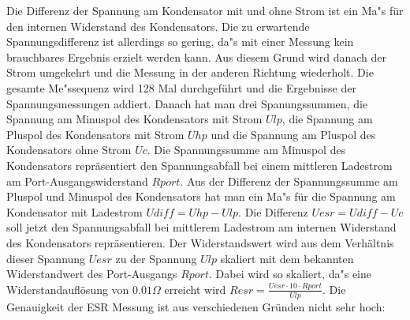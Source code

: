 Die Differenz der Spannung am Kondensator mit und ohne Strom ist ein Ma"s f\"ur den internen Widerstand des Kondensators.
Die zu erwartende Spannungsdifferenz ist allerdings so gering, da"s mit einer Messung kein brauchbares Ergebnis erzielt
werden kann.
Aus diesem Grund wird danach der Strom umgekehrt und die Messung in der anderen Richtung wiederholt.
Die gesamte Me"ssequenz wird 128 Mal durchgef\"uhrt und die Ergebnisse der Spannungsmessungen addiert.
Danach hat man drei Spanungssummen, die Spannung am Minuspol des Kondensators mit Strom \(Ulp\), die Spannung am
Pluspol des Kondensators mit Strom \(Uhp\) und die Spannung am Pluspol des Kondensators ohne Strom \(Uc\).
Die Spannungssumme am Minuspol des Kondensators repr\"asentiert den Spannungsabfall bei einem mittleren
Ladestrom am Port-Ausgangswiderstand \(Rport\). Aus der Differenz der Spannungssumme am Pluspol und Minuspol des Kondensators
hat man ein Ma"s f\"ur die Spannung am Kondensator mit Ladestrom \(Udiff = Uhp - Ulp\).
Die Differenz \(Uesr = Udiff - Uc\) soll jetzt den Spannungsabfall bei mittlerem Ladestrom am internen Widerstand des Kondensators
repr\"asentieren.
Der Widerstandswert wird aus dem Verh\"altnis dieser Spannung \(Uesr\) zu der Spannung \(Ulp\) skaliert mit dem
bekannten Widerstandwert des Port-Ausgangs \(Rport\). Dabei wird so skaliert, da"s eine Widerstandaufl\"osung von
\(0.01 \Omega\) erreicht wird \(Resr = \frac{Uesr \cdot 10 \cdot Rport}{Ulp}\).
Die Genauigkeit der ESR Messung ist aus verschiedenen Gr\"unden nicht sehr hoch:
